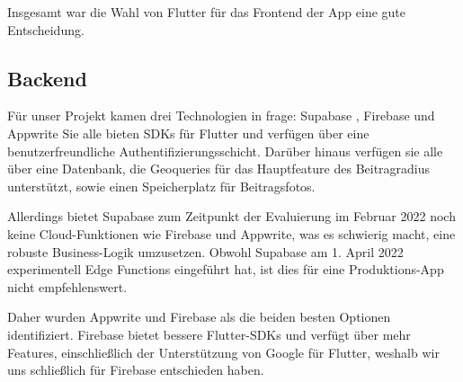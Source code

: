 Insgesamt war die Wahl von Flutter für das Frontend der App eine gute Entscheidung.

\subsection
{Backend}






Für unser Projekt kamen drei Technologien in frage: Supabase \cite{supabase}, Firebase\cite{firebase} und Appwrite\cite{appwrite} Sie alle bieten SDKs für Flutter und verfügen über eine benutzerfreundliche Authentifizierungsschicht. Darüber hinaus verfügen sie alle über eine Datenbank, die Geoqueries für das Hauptfeature des Beitragradius unterstützt, sowie einen Speicherplatz für Beitragsfotos.

Allerdings bietet Supabase zum Zeitpunkt der Evaluierung im Februar 2022 noch keine Cloud-Funktionen wie Firebase und Appwrite, was es schwierig macht, eine robuste Business-Logik umzusetzen. Obwohl Supabase am 1. April 2022 experimentell Edge Functions eingeführt hat, ist dies für eine Produktions-App nicht empfehlenswert.

Daher wurden Appwrite und Firebase als die beiden besten Optionen identifiziert. Firebase bietet bessere Flutter-SDKs und verfügt über mehr Features, einschließlich der Unterstützung von Google für Flutter, weshalb wir uns schließlich für Firebase entschieden haben.

